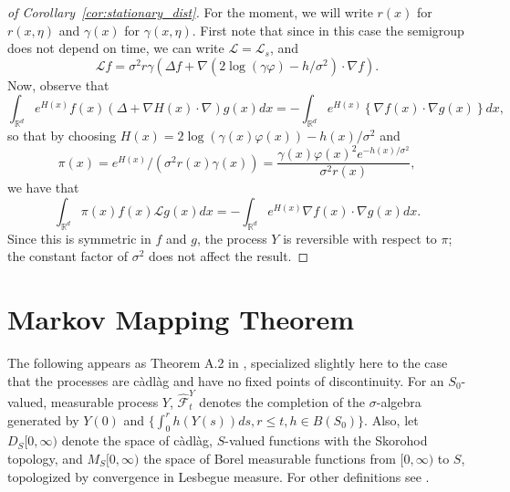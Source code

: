 \documentclass[EJP]{ejpecp} %
\renewcommand{\hat}{\widehat}
\newcommand{\IR}{\mathbb R}
\newcommand{\grad}{\nabla}
\newcommand{\Lgen}{\mathcal{L}}    %
\newcommand{\citet}[1]{\cite{#1}}
\begin{document}
\begin{proof}[of Corollary~\ref{cor:stationary_dist}]
For the moment, we will write $r(x)$ for $r(x,\eta)$
and $\gamma(x)$ for $\gamma(x,\eta)$.
First note that
since in this case the semigroup does not depend on time, 
we can write $\Lgen = \Lgen_s$, and
$$
    \Lgen f = \sigma^2 r \gamma \left(
        \Delta f
        + \grad ( 2 \log(\gamma \varphi) - h/\sigma^2 ) \cdot \grad f
    \right) .
$$
Now, observe that
$$
    \int_{\IR^d} e^{H(x)} f(x) (\Delta + \grad H(x) \cdot \grad) g(x) dx
    =
    - \int_{\IR^d} e^{H(x)} \left\{
        \grad f(x) \cdot \grad g(x)
    \right\} dx ,
$$
so that by choosing $H(x) = 2 \log(\gamma(x) \varphi(x)) - h(x)/\sigma^2$
and
$$ \pi(x)
    = e^{H(x)} / (\sigma^2 r(x) \gamma(x))
    = \frac{\gamma(x) \varphi(x)^2 e^{-h(x)/\sigma^2}}{\sigma^2 r(x)} ,
$$
we have that
$$
    \int_{\IR^d} \pi(x) f(x) \Lgen g(x) dx
    =
    - \int_{\IR^d} e^{H(x)} \grad f(x) \cdot \grad g(x) dx .
$$
Since this is symmetric in $f$ and $g$, the process $Y$ is reversible with respect to $\pi$;
the constant factor of $\sigma^2$ does not affect the result.
\end{proof}

\newpage
\appendix

\section{Markov Mapping Theorem}
\label{apx:mmt}

The following appears as Theorem A.2 in \citet{etheridge/kurtz:2019},
specialized slightly here to the case that the processes 
are c\`adl\`ag and have no fixed points of discontinuity.
For an $S_0$-valued, measurable process $Y$, $\hat{\mathcal{F}}^Y_t$
denotes the completion of the $\sigma$-algebra generated by
$Y(0)$ and $\{\int_0^r h(Y(s)) ds, r \le t, h \in B(S_0)\}$.
Also, let $D_S[0,\infty)$ denote the space of c\`adl\`ag, $S$-valued functions
with the Skorohod topology, and $M_S[0,\infty)$ the space of Borel measurable functions
from $[0,\infty)$ to $S$,
topologized by convergence in Lesbegue measure.
For other definitions see \citet{etheridge/kurtz:2019}.
\end{document}
